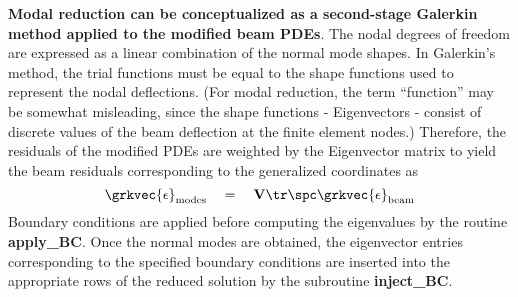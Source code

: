 \textbf{Modal reduction can be conceptualized as a second-stage Galerkin method applied to the modified beam PDEs}. The nodal degrees of freedom are expressed as a linear combination of the normal mode shapes. In Galerkin's method, the trial functions must be equal to the shape functions used to represent the nodal deflections. (For modal reduction, the term ``function'' may be somewhat misleading, since the shape functions - Eigenvectors - consist of discrete values of the beam deflection at the finite element nodes.) Therefore, the residuals of the modified PDEs are weighted by the Eigenvector matrix to yield the beam residuals corresponding to the generalized coordinates as
\begin{equation}
\label{eqn:epsbeam}
\grkvec{\epsilon}_\textrm{modes} \quad = \quad \textbf{V}\tr \spc  \grkvec{\epsilon}_\textrm{beam}
\end{equation}
Boundary conditions are applied before computing the eigenvalues by the routine \textbf{apply\_BC}. Once the normal modes are obtained, the eigenvector entries corresponding to the specified boundary conditions are inserted into the appropriate rows of the reduced solution by the subroutine \textbf{inject\_BC}.
